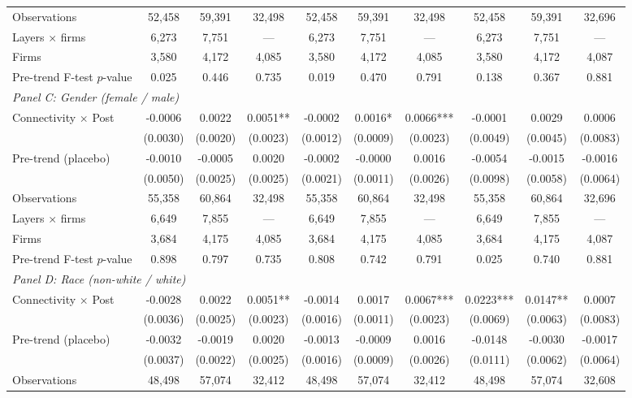 \begin{table}[H]
{\begin{tabular}{lccccccccc}
\quad Observations & 52,458 & 59,391 & 32,498 & 52,458 & 59,391 & 32,498 & 52,458 & 59,391 & 32,696 \\
\quad Layers $\times$ firms & 6,273 & 7,751 & --- & 6,273 & 7,751 & --- & 6,273 & 7,751 & --- \\
\quad Firms & 3,580 & 4,172 & 4,085 & 3,580 & 4,172 & 4,085 & 3,580 & 4,172 & 4,087 \\
\quad Pre-trend F-test $p$-value & 0.025 & 0.446 & 0.735 & 0.019 & 0.470 & 0.791 & 0.138 & 0.367 & 0.881 \\[6pt]
\multicolumn{10}{l}{\textit{Panel C: Gender (female / male)}} \\
\quad Connectivity $\times$ Post & -0.0006 & 0.0022 & 0.0051** & -0.0002 & 0.0016* & 0.0066*** & -0.0001 & 0.0029 & 0.0006 \\
 & (0.0030) & (0.0020) & (0.0023) & (0.0012) & (0.0009) & (0.0023) & (0.0049) & (0.0045) & (0.0083) \\
\quad Pre-trend (placebo) & -0.0010 & -0.0005 & 0.0020 & -0.0002 & -0.0000 & 0.0016 & -0.0054 & -0.0015 & -0.0016 \\
 & (0.0050) & (0.0025) & (0.0025) & (0.0021) & (0.0011) & (0.0026) & (0.0098) & (0.0058) & (0.0064) \\
\quad Observations & 55,358 & 60,864 & 32,498 & 55,358 & 60,864 & 32,498 & 55,358 & 60,864 & 32,696 \\
\quad Layers $\times$ firms & 6,649 & 7,855 & --- & 6,649 & 7,855 & --- & 6,649 & 7,855 & --- \\
\quad Firms & 3,684 & 4,175 & 4,085 & 3,684 & 4,175 & 4,085 & 3,684 & 4,175 & 4,087 \\
\quad Pre-trend F-test $p$-value & 0.898 & 0.797 & 0.735 & 0.808 & 0.742 & 0.791 & 0.025 & 0.740 & 0.881 \\[6pt]
\multicolumn{10}{l}{\textit{Panel D: Race (non-white / white)}} \\
\quad Connectivity $\times$ Post & -0.0028 & 0.0022 & 0.0051** & -0.0014 & 0.0017 & 0.0067*** & 0.0223*** & 0.0147** & 0.0007 \\
 & (0.0036) & (0.0025) & (0.0023) & (0.0016) & (0.0011) & (0.0023) & (0.0069) & (0.0063) & (0.0083) \\
\quad Pre-trend (placebo) & -0.0032 & -0.0019 & 0.0020 & -0.0013 & -0.0009 & 0.0016 & -0.0148 & -0.0030 & -0.0017 \\
 & (0.0037) & (0.0022) & (0.0025) & (0.0016) & (0.0009) & (0.0026) & (0.0111) & (0.0062) & (0.0064) \\
\quad Observations & 48,498 & 57,074 & 32,412 & 48,498 & 57,074 & 32,412 & 48,498 & 57,074 & 32,608 \\

\end{tabular}}
\end{table}
